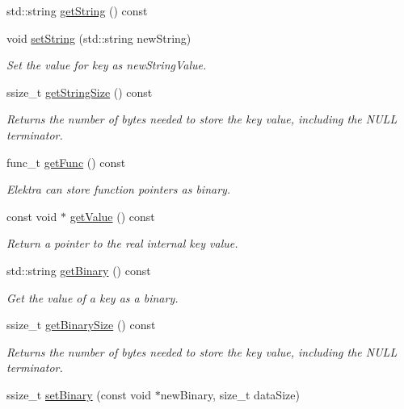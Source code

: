 \begin{DoxyCompactItemize}
std\-::string \hyperlink{classkdb_1_1Key_afbad98e920ffb6d65d5d690be73ae6d9}{get\-String} () const 
\item 
void \hyperlink{classkdb_1_1Key_ab97ef37aa235f0ae04dc6e6c21109d1a}{set\-String} (std\-::string new\-String)
\begin{DoxyCompactList}\small\item\em Set the value for {\ttfamily key} as {\ttfamily new\-String\-Value}.  \end{DoxyCompactList}\item 
ssize\-\_\-t \hyperlink{classkdb_1_1Key_af3032a91f0fbf111b6b5e42dd35865db}{get\-String\-Size} () const 
\begin{DoxyCompactList}\small\item\em Returns the number of bytes needed to store the key value, including the N\-U\-L\-L terminator.  \end{DoxyCompactList}\item 
func\-\_\-t \hyperlink{classkdb_1_1Key_a9e4f81dae7370976dad75030e8c0d084}{get\-Func} () const 
\begin{DoxyCompactList}\small\item\em Elektra can store function pointers as binary. \end{DoxyCompactList}\item 
const void $\ast$ \hyperlink{classkdb_1_1Key_a3e0bbc6b746b89db7abb73a4cc2fff39}{get\-Value} () const 
\begin{DoxyCompactList}\small\item\em Return a pointer to the real internal {\ttfamily key} value.  \end{DoxyCompactList}\item 
std\-::string \hyperlink{classkdb_1_1Key_a16b64fd6db0a743e2e4ab08daf6fba73}{get\-Binary} () const 
\begin{DoxyCompactList}\small\item\em Get the value of a key as a binary.  \end{DoxyCompactList}\item 
ssize\-\_\-t \hyperlink{classkdb_1_1Key_af173c1c4ab4104c5bc48a98cf011ca8d}{get\-Binary\-Size} () const 
\begin{DoxyCompactList}\small\item\em Returns the number of bytes needed to store the key value, including the N\-U\-L\-L terminator.  \end{DoxyCompactList}\item 
ssize\-\_\-t \hyperlink{classkdb_1_1Key_af7211129a4b95f4d1e335dcd06e9bf0a}{set\-Binary} (const void $\ast$new\-Binary, size\-\_\-t data\-Size)

\end{DoxyCompactItemize}
